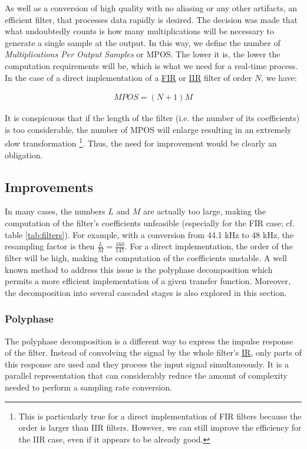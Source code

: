 As well as a conversion of high quality with no aliasing or any other artifacts, an efficient filter, that processes data rapidly is desired. The decision was made that what undoubtedly counts is how many multiplications will be necessary to generate a single sample at the output. In this way, we define the number of \textit{Multiplications Per Output Samples} or MPOS. The lower it is, the lower the computation requirements will be, which is what we need for a real-time process. In the case of a direct implementation of a \hyperlink{FIR}{FIR} or  \hyperlink{IIR}{IIR} filter of order $N$, we have:

\begin{align}
	MPOS = (N + 1)M \label{eqn:mpos_direct} 
\end{align} 

It is conspicuous that if the length of the filter (i.e. the  number of its coefficients) is too considerable, the number of MPOS will enlarge resulting in an extremely slow transformation \footnote{This is particularly true for a direct implementation of FIR filters because the order is larger than IIR filters. However, we can still improve the efficiency for the IIR case, even if it appears to be already good.}. Thus, the need for improvement would be clearly an obligation.
\subsection{Improvements} 

In many cases, the numbers $L$ and $M$ are actually too large, making the computation of the filter's coefficients unfeasible (especially for the FIR case; cf. table \ref{tab:filters}). For example, with a conversion from 44.1 kHz to 48 kHz, the resampling factor is then $\frac{L}{M} = \frac{160}{147}$. For a direct implementation, the order of the filter will be high, making the computation of the coefficients unstable. A well known method to address this issue is the polyphase decomposition which permits a more efficient implementation of a given transfer function. Moreover, the decomposition into several cascaded stages is also explored in this section.


\subsubsection{Polyphase}

The polyphase decomposition is a different way to express the impulse response of the filter. Instead of convolving the signal by the whole filter's \hyperlink{IR}{IR}, only parts of this response are used and they process the input signal simultaneously.
 It is a parallel representation that can considerably reduce the amount of complexity needed to perform a sampling rate conversion. 

